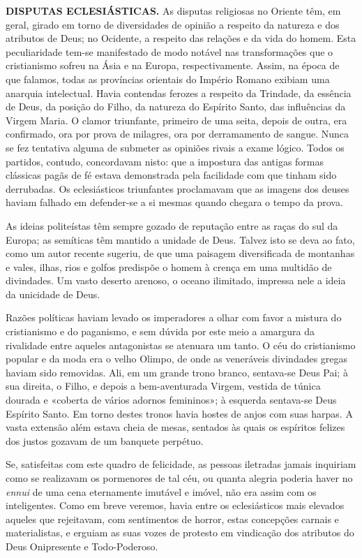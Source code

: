 \documentclass[11pt,a5paper,twoside,openany]{book}
\begin{document}
\textbf{DISPUTAS ECLESIÁSTICAS.} As disputas religiosas no Oriente têm, em geral, girado em torno de diversidades de opinião a respeito da natureza e dos atributos de Deus; no Ocidente, a respeito das relações e da vida do homem. Esta peculiaridade tem-se manifestado de modo notável nas transformações que o cristianismo sofreu na Ásia e na Europa, respectivamente. Assim, na época de que falamos, todas as províncias orientais do Império Romano exibiam uma anarquia intelectual. Havia contendas ferozes a respeito da Trindade, da essência de Deus, da posição do Filho, da natureza do Espírito Santo, das influências da Virgem Maria. O clamor triunfante, primeiro de uma seita, depois de outra, era confirmado, ora por prova de milagres, ora por derramamento de sangue. Nunca se fez tentativa alguma de submeter as opiniões rivais a exame lógico. Todos os partidos, contudo, concordavam nisto: que a impostura das antigas formas clássicas pagãs de fé estava demonstrada pela facilidade com que tinham sido derrubadas. Os eclesiásticos triunfantes proclamavam que as imagens dos deuses haviam falhado em defender-se a si mesmas quando chegara o tempo da prova.

As ideias politeístas têm sempre gozado de reputação entre as raças do sul da Europa; as semíticas têm mantido a unidade de Deus. Talvez isto se deva ao fato, como um autor recente sugeriu, de que uma paisagem diversificada de montanhas e vales, ilhas, rios e golfos predispõe o homem à crença em uma multidão de divindades. Um vasto deserto arenoso, o oceano ilimitado, impressa nele a ideia da unicidade de Deus.

Razões políticas haviam levado os imperadores a olhar com favor a mistura do cristianismo e do paganismo, e sem dúvida por este meio a amargura da rivalidade entre aqueles antagonistas se atenuara um tanto. O céu do cristianismo popular e da moda era o velho Olimpo, de onde as veneráveis divindades gregas haviam sido removidas. Ali, em um grande trono branco, sentava-se Deus Pai; à sua direita, o Filho, e depois a bem-aventurada Virgem, vestida de túnica dourada e «coberta de vários adornos femininos»; à esquerda sentava-se Deus Espírito Santo. Em torno destes tronos havia hostes de anjos com suas harpas. A vasta extensão além estava cheia de mesas, sentados às quais os espíritos felizes dos justos gozavam de um banquete perpétuo.

Se, satisfeitas com este quadro de felicidade, as pessoas iletradas jamais inquiriam como se realizavam os pormenores de tal céu, ou quanta alegria poderia haver no \textit{ennui} de uma cena eternamente imutável e imóvel, não era assim com os inteligentes. Como em breve veremos, havia entre os eclesiásticos mais elevados aqueles que rejeitavam, com sentimentos de horror, estas concepções carnais e materialistas, e erguiam as suas vozes de protesto em vindicação dos atributos do Deus Onipresente e Todo-Poderoso.
\end{document}
